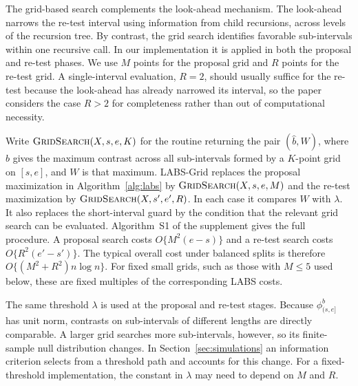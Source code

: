 \documentclass[12pt, a4paper]{article}
\begin{document}
The grid-based search complements the look-ahead mechanism. The look-ahead narrows the re-test interval using information from child recursions, across levels of the recursion tree. By contrast, the grid search identifies favorable sub-intervals within one recursive call. In our implementation it is applied in both the proposal and re-test phases. We use $M$ points for the proposal grid and $R$ points for the re-test grid. A single-interval evaluation, $R=2$, should usually suffice for the re-test because the look-ahead has already narrowed its interval, so the paper considers the case $R > 2$ for completeness rather than out of computational necessity.

Write $\textsc{GridSearch}(X,s,e,K)$ for the routine returning the pair $(\hat b,W)$, where $\hat b$ gives the maximum contrast across all sub-intervals formed by a $K$-point grid on $[s,e]$, and $W$ is that maximum. LABS-Grid replaces the proposal maximization in Algorithm~\ref{alg:labs} by $\textsc{GridSearch}(X,s,e,M)$ and the re-test maximization by $\textsc{GridSearch}(X,s',e',R)$. In each case it compares $W$ with $\lambda$. It also replaces the short-interval guard by the condition that the relevant grid search can be evaluated. Algorithm~S1 of the supplement gives the full procedure. A proposal search costs $O\{M^2(e-s)\}$ and a re-test search costs $O\{R^2(e'-s')\}$. The typical overall cost under balanced splits is therefore $O\{(M^2+R^2)n\log n\}$. For fixed small grids, such as those with $M\leq 5$ used below, these are fixed multiples of the corresponding LABS costs.

The same threshold $\lambda$ is used at the proposal and re-test stages. Because $\phi^b_{(s,e]}$ has unit norm, contrasts on sub-intervals of different lengths are directly comparable. A larger grid searches more sub-intervals, however, so its finite-sample null distribution changes. In Section~\ref{sec:simulations} an information criterion selects from a threshold path and accounts for this change. For a fixed-threshold implementation, the constant in $\lambda$ may need to depend on $M$ and $R$.
\end{document}
